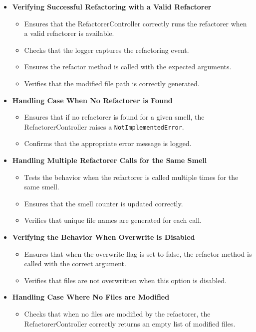 \documentclass[12pt, titlepage]{article}
\begin{document}
  \begin{itemize}
    \item \textbf{Verifying Successful Refactoring with a Valid Refactorer}
      \begin{itemize}
        \item Ensures that the RefactorerController correctly runs
          the refactorer when a valid refactorer is available.
        \item Checks that the logger captures the refactoring event.
        \item Ensures the refactor method is called with the expected arguments.
        \item Verifies that the modified file path is correctly generated.
      \end{itemize}

    \item \textbf{Handling Case When No Refactorer is Found}
      \begin{itemize}
        \item Ensures that if no refactorer is found for a given
          smell, the RefactorerController raises a \texttt{NotImplementedError}.
        \item Confirms that the appropriate error message is logged.
      \end{itemize}

    \item \textbf{Handling Multiple Refactorer Calls for the Same Smell}
      \begin{itemize}
        \item Tests the behavior when the refactorer is called
          multiple times for the same smell.
        \item Ensures that the smell counter is updated correctly.
        \item Verifies that unique file names are generated for each call.
      \end{itemize}

    \item \textbf{Verifying the Behavior When Overwrite is Disabled}
      \begin{itemize}
        \item Ensures that when the overwrite flag is set to false,
          the refactor method is called with the correct argument.
        \item Verifies that files are not overwritten when this
          option is disabled.
      \end{itemize}

    \item \textbf{Handling Case Where No Files are Modified}
      \begin{itemize}
        \item Checks that when no files are modified by the
          refactorer, the RefactorerController correctly returns an
          empty list of modified files.
      \end{itemize}
  \end{itemize}
\end{document}
